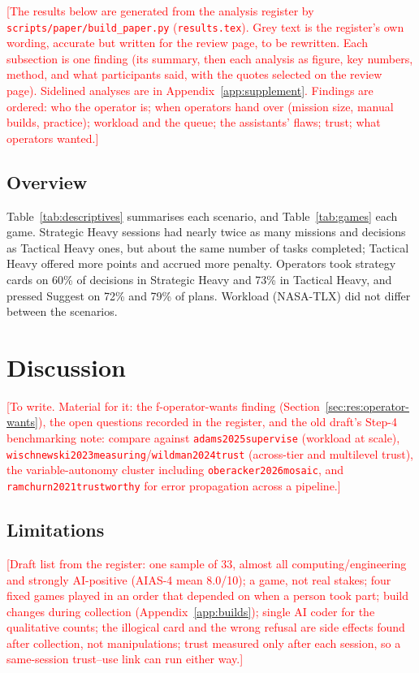 \documentclass[10pt]{article}
\theoremstyle{definition}
\newcommand{\todo}[1]{\textcolor{red}{[#1]}}
\begin{document}
\todo{The results below are generated from the analysis register by \texttt{scripts/paper/build\_paper.py}
(\texttt{results.tex}). Grey text is the register's own wording, accurate but written for the review page, to be
rewritten. Each subsection is one finding (its summary, then each analysis as figure, key numbers, method, and what
participants said, with the quotes selected on the review page). Sidelined analyses are in
Appendix~\ref{app:supplement}. Findings are ordered: who the operator is; when operators hand over (mission size,
manual builds, practice); workload and the queue; the assistants' flaws; trust; what operators wanted.}

\subsection{Overview}\label{sec:res:overview}

Table~\ref{tab:descriptives} summarises each scenario, and Table~\ref{tab:games} each game. Strategic Heavy sessions
had nearly twice as many missions and decisions as Tactical Heavy ones, but about the same number of tasks completed;
Tactical Heavy offered more points and accrued more penalty. Operators took strategy cards on 60\% of decisions in
Strategic Heavy and 73\% in Tactical Heavy, and pressed Suggest on 72\% and 79\% of plans. Workload (NASA-TLX) did not
differ between the scenarios.



\FloatBarrier


\section{Discussion}\label{sec:discussion}

\todo{To write. Material for it: the f-operator-wants finding (Section~\ref{sec:res:operator-wants}), the
open questions recorded in the register, and the old draft's Step-4 benchmarking note: compare against
\texttt{adams2025supervise} (workload at scale), \texttt{wischnewski2023measuring}/\texttt{wildman2024trust}
(across-tier and multilevel trust), the variable-autonomy cluster including \texttt{oberacker2026mosaic}, and
\texttt{ramchurn2021trustworthy} for error propagation across a pipeline.}

\subsection{Limitations}
\todo{Draft list from the register: one sample of 33, almost all computing/engineering and strongly AI-positive
(AIAS-4 mean 8.0/10); a game, not real stakes; four fixed games played in an order that depended on when a person took
part; build changes during collection (Appendix~\ref{app:builds}); single AI coder for the qualitative counts; the
illogical card and the wrong refusal are side effects found after collection, not manipulations; trust measured only
after each session, so a same-session trust--use link can run either way.}
\end{document}
